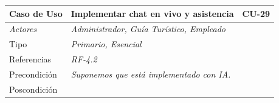 








\begin{table}[H]
    \begin{tabular}{|llllllll|}
    \hline
    \multicolumn{1}{|l|}{\cellcolor[HTML]{F2F2F2}Caso de Uso}           & \multicolumn{5}{l|}{Implementar chat en vivo y asistencia}                                                                       & \multicolumn{2}{l|}{\cellcolor[HTML]{E6E6E6}CU-29}             \\ \hline
    \multicolumn{1}{|l|}{{\color[HTML]{808080} \textit{Actores}}}       & \multicolumn{7}{l|}{{\color[HTML]{808080} \textit{Administrador, Guía Turístico, Empleado}}}                                                                                                      \\ \hline
    \multicolumn{1}{|l|}{Tipo}                                          & \multicolumn{7}{l|}{{\color[HTML]{808080} \textit{Primario, Esencial}}}                                                                                                                           \\ \hline
    \multicolumn{1}{|l|}{Referencias}                                   & \multicolumn{2}{l|}{{\color[HTML]{808080} \textit{RF-4.2}}}                & \multicolumn{5}{l|}{}                                                                                                \\ \hline
    \multicolumn{1}{|l|}{Precondición}                                  & \multicolumn{7}{l|}{{\color[HTML]{808080} \textit{Suponemos que está implementado con IA.}}}                                                                                                      \\ \hline
    \multicolumn{1}{|l|}{Poscondición}                                  & \multicolumn{7}{l|}{}                                                                                                                                                                             \\ \hline

\end{tabular}
\end{table}
